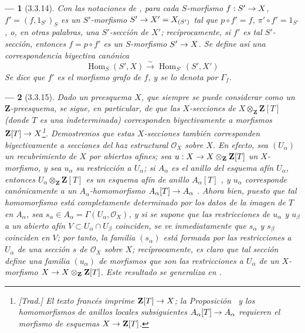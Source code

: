 \documentclass[oneside]{amsart}
\theoremstyle{ega-env-style}
\newtheorem*{env}{---}
\theoremstyle{ega-thm-env-style}
\theoremstyle{ega-defn-env-style}
\def\mathcal{\mathscr}
\def\bb{\mathbf}                    %
\renewcommand{\to}{\mathchoice{\longrightarrow}{\rightarrow}{\rightarrow}{\rightarrow}}
\let\EGAOriginalLabel\label
\renewcommand{\label}[1]{\phantomsection\EGAOriginalLabel{#1}}
\begin{document}
\begin{env}[3.3.14]
\label{I.3.3.14}
Con las notaciones de , para cada \emph{$S$-morfismo}
$f:S'\to X$, $f'=(f,1_{S'})_S$ es un $S'$-morfismo $S'\to X'=X_{(S')}$ tal que
$p\circ f'=f$, $\pi'\circ f'=1_{S'}$, o, en otras palabras, una
\emph{$S'$-sección de $X'$}; recíprocamente, si $f'$ es tal $S'$-sección, entonces
$f=p\circ f'$ es un
$S$-morfismo $S'\to X$. Se define así una \emph{correspondencia biyectiva}
canónica
\label{I.3.3.14.correspondence-fr}
\[
  \operatorname{Hom}_S(S',X)\overset{\sim}{\longrightarrow}
  \operatorname{Hom}_{S'}(S',X')
\]
Se dice que $f'$ es el \emph{morfismo grafo} de $f$, y se lo denota por
$\Gamma_f$.
\end{env}

\begin{env}[3.3.15]
\label{I.3.3.15}
Dado un preesquema $X$, que siempre se puede considerar como un $\mathbf{Z}$-preesquema,
se sigue, en particular, de  que las $X$-\emph{secciones} de
$X\otimes_{\mathbf{Z}}\mathbf{Z}[T]$ (donde $T$ es una indeterminada)
corresponden biyectivamente a \emph{morfismos} $\mathbf{Z}[T]\to X$\footnote{\emph{[Trad.]
El texto francés imprime $\bb{Z}[T]\to X$; la Proposición~ y los
homomorfismos de anillos locales subsiguientes $A_\alpha[T]\to A_\alpha$ requieren el morfismo de
esquemas $X\to\bb{Z}[T]$.}}. Demostremos que estas
$X$-secciones también corresponden biyectivamente a \emph{secciones del haz estructural
$\mathcal{O}_X$ sobre $X$}. En efecto, sea $(U_\alpha)$ un recubrimiento de $X$ por abiertos
afines; sea $u:X\to X\otimes_{\mathbf{Z}}\mathbf{Z}[T]$ un $X$-morfismo, y sea
$u_\alpha$ su restricción a $U_\alpha$; si $A_\alpha$ es el anillo del esquema
afín $U_\alpha$, entonces $U_\alpha\otimes_{\mathbf{Z}}\mathbf{Z}[T]$ es un esquema afín
de anillo $A_\alpha[T]$ , y $u_\alpha$ corresponde canónicamente a un
$A_\alpha$-homomorfismo $A_\alpha[T]\to A_\alpha$
. Ahora bien, puesto que tal homomorfismo está completamente determinado por
los datos de la imagen de $T$ en $A_\alpha$, sea
$s_\alpha\in A_\alpha=\Gamma(U_\alpha,\mathcal{O}_X)$, y si se supone que las
restricciones de $u_\alpha$ y $u_\beta$ a un abierto afín
$V\subset U_\alpha\cap U_\beta$ coinciden, se ve inmediatamente que
$s_\alpha$ y $s_\beta$ coinciden en $V$; por tanto, la familia $(s_\alpha)$ está formada
por las restricciones a $U_\alpha$ de una sección $s$ de $\mathcal{O}_X$ sobre $X$;
recíprocamente, es claro que tal sección define una familia $(u_\alpha)$ de
morfismos que son las restricciones a $U_\alpha$ de un $X$-morfismo
$X\to X\otimes_{\mathbf{Z}}\mathbf{Z}[T]$. Este resultado se generaliza en
.
\end{env}
\end{document}
